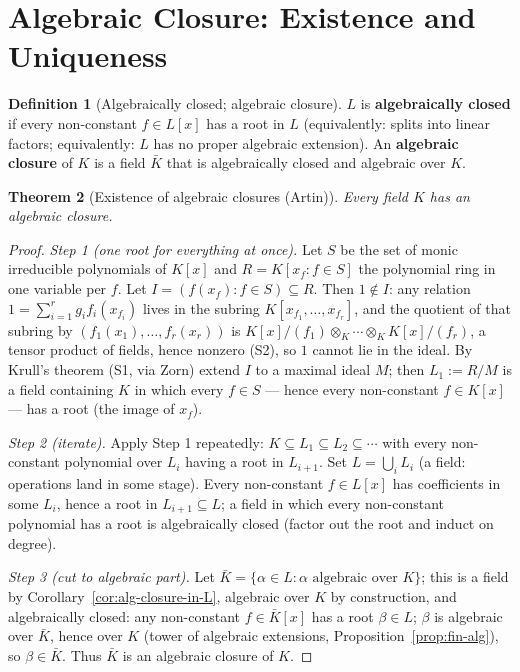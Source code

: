 \documentclass[11pt,a4paper]{article}
\newtheorem{theorem}{Theorem}[section]
\theoremstyle{definition}
\newtheorem{definition}[theorem]{Definition}
\begin{document}
\section{Algebraic Closure: Existence and Uniqueness}

\begin{definition}[Algebraically closed; algebraic closure]
$L$ is \textbf{algebraically closed} if every non-constant $f\in L[x]$ has a root in $L$
(equivalently: splits into linear factors; equivalently: $L$ has no proper algebraic extension).
An \textbf{algebraic closure} of $K$ is a field $\bar K$ that is algebraically closed and algebraic
over $K$.
\end{definition}

\begin{theorem}[Existence of algebraic closures (Artin)]\label{thm:alg-closure}
Every field $K$ has an algebraic closure.
\end{theorem}
\begin{proof}
\emph{Step 1 (one root for everything at once).} Let $S$ be the set of monic irreducible polynomials
of $K[x]$ and $R=K[x_f:f\in S]$ the polynomial ring in one variable per $f$. Let
$I=(f(x_f):f\in S)\subseteq R$. Then $1\notin I$: any relation $1=\sum_{i=1}^r g_i f_i(x_{f_i})$
lives in the subring $K[x_{f_1},\dots,x_{f_r}]$, and the quotient of that subring by
$(f_1(x_1),\dots,f_r(x_r))$ is $K[x]/(f_1)\otimes_K\cdots\otimes_K K[x]/(f_r)$, a tensor product of
fields, hence nonzero (S2), so $1$ cannot lie in the ideal. By Krull's theorem (S1, via Zorn) extend
$I$ to a maximal ideal $M$; then $L_1:=R/M$ is a field containing $K$ in which every $f\in S$ ---
hence every non-constant $f\in K[x]$ --- has a root (the image of $x_f$).

\emph{Step 2 (iterate).} Apply Step 1 repeatedly: $K\subseteq L_1\subseteq L_2\subseteq\cdots$ with
every non-constant polynomial over $L_i$ having a root in $L_{i+1}$. Set $L=\bigcup_i L_i$ (a field:
operations land in some stage). Every non-constant $f\in L[x]$ has coefficients in some $L_i$, hence
a root in $L_{i+1}\subseteq L$; a field in which every non-constant polynomial has a root is
algebraically closed (factor out the root and induct on degree).

\emph{Step 3 (cut to algebraic part).} Let $\bar K=\{\alpha\in L:\alpha\text{ algebraic over }K\}$;
this is a field by Corollary~\ref{cor:alg-closure-in-L}, algebraic over $K$ by construction, and
algebraically closed: any non-constant $f\in\bar K[x]$ has a root $\beta\in L$; $\beta$ is algebraic
over $\bar K$, hence over $K$ (tower of algebraic extensions, Proposition~\ref{prop:fin-alg}), so
$\beta\in\bar K$. Thus $\bar K$ is an algebraic closure of $K$.
\end{proof}
\end{document}
